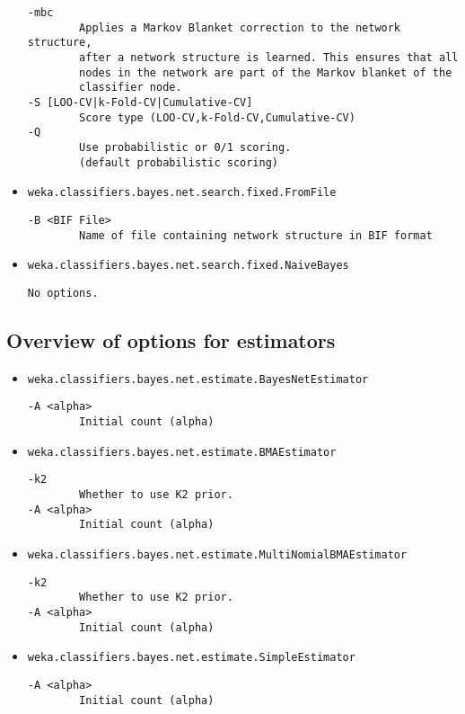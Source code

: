 \documentclass[a4paper]{article}
\begin{document}
\begin{itemize}
  \begin{verbatim}
-mbc
        Applies a Markov Blanket correction to the network structure,
        after a network structure is learned. This ensures that all
        nodes in the network are part of the Markov blanket of the
        classifier node.
-S [LOO-CV|k-Fold-CV|Cumulative-CV]
        Score type (LOO-CV,k-Fold-CV,Cumulative-CV)
-Q
        Use probabilistic or 0/1 scoring.
        (default probabilistic scoring)
  \end{verbatim}
\item \texttt{weka.classifiers.bayes.net.search.fixed.FromFile}
  \begin{verbatim}
-B <BIF File>
        Name of file containing network structure in BIF format
  \end{verbatim}
\item \texttt{weka.classifiers.bayes.net.search.fixed.NaiveBayes}
  \begin{verbatim}
No options.
  \end{verbatim}
\end{itemize}

\subsection*{Overview of options for estimators}

\begin{itemize}
\item \texttt{weka.classifiers.bayes.net.estimate.BayesNetEstimator}
  \begin{verbatim}
-A <alpha>
        Initial count (alpha)
  \end{verbatim}
\item \texttt{weka.classifiers.bayes.net.estimate.BMAEstimator}
  \begin{verbatim}
-k2
        Whether to use K2 prior.
-A <alpha>
        Initial count (alpha)
  \end{verbatim}
\item \texttt{weka.classifiers.bayes.net.estimate.MultiNomialBMAEstimator}
  \begin{verbatim}
-k2
        Whether to use K2 prior.
-A <alpha>
        Initial count (alpha)
  \end{verbatim}
\item \texttt{weka.classifiers.bayes.net.estimate.SimpleEstimator}
  \begin{verbatim}
-A <alpha>
        Initial count (alpha)
  \end{verbatim}
\end{itemize}
\end{document}
